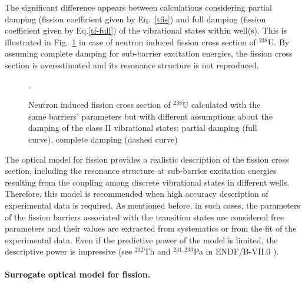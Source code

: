 The significant difference appears between calculations considering partial
damping (fission coefficient given by Eq.~\ref{tfis}) and full damping
(fission coefficient given by Eq.\ref{tf-full}) of the vibrational states
within well(s). This is illustrated in Fig.~\ref{fis-u38-fcom} in case of
neutron induced fission cross section of $^{238}$U. By assuming complete
damping for sub-barrier excitation energies, the fission cross section is
overestimated and its resonance structure is not reproduced.
\begin{figure}[htbp]
 .
\caption{Neutron induced fission cross section of $^{238}$U calculated with
the same barriers' parameters but with different assumptions about the
damping of the class II vibrational states: partial damping (full curve),
complete damping (dashed curve)}
\label{fis-u38-fcom}
\end{figure}

The optical model for fission provides a realistic description of the
fission cross section, including the resonance structure at sub-barrier
excitation energies resulting from the coupling among discrete vibrational
states in different wells. Therefore, this model is recommended when high
accuracy description of experimental data is required. As mentioned before,
in such cases, the parameters of the fission barriers associated with the
transition states are considered free parameters and their values are
extracted from systematics or from the fit of the experimental data. Even if
the predictive power of the model is limited, the descriptive power is
impressive (see $^{232}$Th and $^{231,233}$Pa in ENDF/B-VII.0\cite{ENDF-VII}%
).

\medskip %

\paragraph*{Surrogate optical model for fission.}

